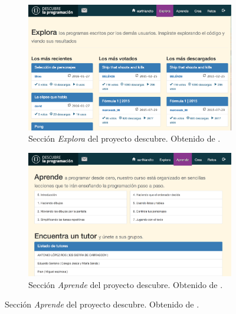 \begin{figure}[!ht]
	\begin{adjustwidth}{\oddsidemargin-1in}{\rightmargin}
			\begin{subfigure}{\paperwidth}
				\centering
				\includegraphics[scale=.35]{images/descubre-explora.png}
				\caption{Sección \emph{Explora} del proyecto \Gls{descubre}. Obtenido de \cite{descubre}.}
				\label{fig:descubre-explora}
			\end{subfigure}
			\begin{subfigure}{\paperwidth}
				\centering
				\includegraphics[scale=.35]{images/descubre-aprende.png}
				\caption{Sección \emph{Aprende} del proyecto \Gls{descubre}. Obtenido de \cite{descubre}.}
				\label{fig:descubre-aprende}
			\end{subfigure}
		\label{fig:decubre-explora-aprende}
	\end{adjustwidth}
\end{figure}


